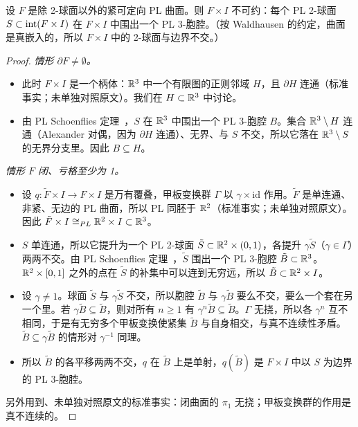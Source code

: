 \begin{lemma}\label{lem:irreducible}
设 $F$ 是除 2-球面以外的紧可定向 PL 曲面。则 $F\times I$ 不可约：每个 PL 2-球面 $S\subset\operatorname{int}(F\times I)$ 在 $F\times I$ 中围出一个 PL 3-胞腔。（按 Waldhausen 的约定，曲面是真嵌入的，所以 $F\times I$ 中的 2-球面与边界不交。）
\end{lemma}
\begin{proof}
\emph{情形 $\partial F\ne\emptyset$。}
\begin{itemize}
\item 此时 $F\times I$ 是一个柄体：$\mathbb{R}^3$ 中一个有限图的正则邻域 $H$，且 $\partial H$ 连通（标准事实；未单独对照原文）。我们在 $H\subset\mathbb{R}^3$ 中讨论。
\item 由 PL Schoenflies 定理~\cite[Thm.~17.12]{Moise77}，$S$ 在 $\mathbb{R}^3$ 中围出一个 PL 3-胞腔 $B$。集合 $\mathbb{R}^3\setminus H$ 连通（Alexander 对偶，因为 $\partial H$ 连通）、无界、与 $S$ 不交，所以它落在 $\mathbb{R}^3\setminus S$ 的无界分支里。因此 $B\subseteq H$。
\end{itemize}
\emph{情形 $F$ 闭、亏格至少为 1。}
\begin{itemize}
\item 设 $q\colon\tilde F\times I\to F\times I$ 是万有覆叠，甲板变换群 $\Gamma$ 以 $\gamma\times\mathrm{id}$ 作用。$\tilde F$ 是单连通、非紧、无边的 PL 曲面，所以 PL 同胚于 $\mathbb{R}^2$（标准事实；未单独对照原文）。因此 $\tilde F\times I\cong_{PL}\mathbb{R}^2\times I\subset\mathbb{R}^3$。
\item $S$ 单连通，所以它提升为一个 PL 2-球面 $\tilde S\subset\mathbb{R}^2\times(0,1)$，各提升 $\gamma\tilde S$（$\gamma\in\Gamma$）两两不交。由 PL Schoenflies 定理~\cite[Thm.~17.12]{Moise77}，$\tilde S$ 围出一个 PL 3-胞腔 $\tilde B\subset\mathbb{R}^3$。$\mathbb{R}^2\times[0,1]$ 之外的点在 $\tilde S$ 的补集中可以连到无穷远，所以 $\tilde B\subset\mathbb{R}^2\times I$。
\item 设 $\gamma\ne1$。球面 $\tilde S$ 与 $\gamma\tilde S$ 不交，所以胞腔 $\tilde B$ 与 $\gamma\tilde B$ 要么不交，要么一个套在另一个里。若 $\gamma\tilde B\subseteq\tilde B$，则对所有 $n\ge1$ 有 $\gamma^n\tilde B\subseteq\tilde B$。$\Gamma$ 无挠，所以各 $\gamma^n$ 互不相同，于是有无穷多个甲板变换使紧集 $\tilde B$ 与自身相交，与真不连续性矛盾。$\tilde B\subseteq\gamma\tilde B$ 的情形对 $\gamma^{-1}$ 同理。
\item 所以 $\tilde B$ 的各平移两两不交，$q$ 在 $\tilde B$ 上是单射，$q(\tilde B)$ 是 $F\times I$ 中以 $S$ 为边界的 PL 3-胞腔。
\end{itemize}
另外用到、未单独对照原文的标准事实：闭曲面的 $\pi_1$ 无挠；甲板变换群的作用是真不连续的。
\end{proof}


